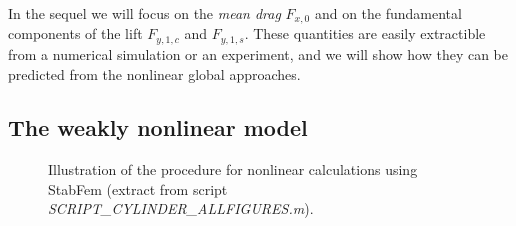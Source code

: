 \documentclass[twocolumn,10pt]{asme2ej}
\begin{document}
In the sequel we will focus on the {\em mean drag}  $F_{x,0}$ and on the fundamental components of the lift  
$F_{y,1,c}$ and $F_{y,1,s}$. These quantities are easily extractible from a numerical simulation or an experiment, and we will
show how they can be predicted from the nonlinear global approaches.
 
  

   








\subsection{The weakly nonlinear model}



\begin{figure*}
\small

 \normalsize
\caption{Illustration of the procedure for nonlinear calculations using StabFem (extract from script {{\em SCRIPT\_CYLINDER\_ALLFIGURES.m})}. }
\label{fig:listingNL}
\end{figure*}
\end{document}
